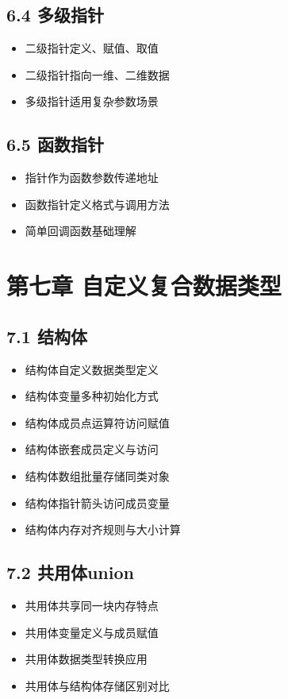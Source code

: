 \subsection{6.4 多级指针}
\begin{itemize}
\item 二级指针定义、赋值、取值
\item 二级指针指向一维、二维数据
\item 多级指针适用复杂参数场景
\end{itemize}

\subsection{6.5 函数指针}
\begin{itemize}
\item 指针作为函数参数传递地址
\item 函数指针定义格式与调用方法
\item 简单回调函数基础理解
\end{itemize}

\section{第七章 自定义复合数据类型}
\subsection{7.1 结构体}
\begin{itemize}
\item 结构体自定义数据类型定义
\item 结构体变量多种初始化方式
\item 结构体成员点运算符访问赋值
\item 结构体嵌套成员定义与访问
\item 结构体数组批量存储同类对象
\item 结构体指针箭头访问成员变量
\item 结构体内存对齐规则与大小计算
\end{itemize}

\subsection{7.2 共用体union}
\begin{itemize}
\item 共用体共享同一块内存特点
\item 共用体变量定义与成员赋值
\item 共用体数据类型转换应用
\item 共用体与结构体存储区别对比
\end{itemize}

